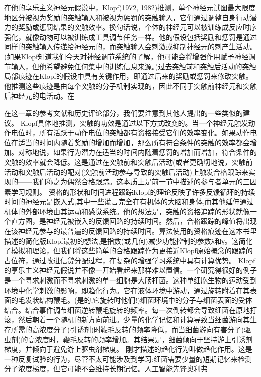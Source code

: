 在他的享乐主义神经元假说中，Klopf(1972, 1982)推测，单个神经元试图最大限度地区分被视为奖励的突触输入和被视为惩罚的突触输入，它们通过调整自身行动潜力的奖励或惩罚结果的突触效率。换句话说，个体的神经元可以被训练成反应时序强化，就像动物可以被训练成工具调节任务一样。他的假设包括奖励和惩罚是通过同样的突触输入传递给神经元的，而突触输入会刺激或抑制神经元的刺产生活动。(如果Klopf知道我们今天对神经调节系统的了解，他可能会将增强作用赋予神经调节输入，但他希望避免任何集中的训练信息来源。)过去突触前和突触后活动的突触局部痕迹在Klopf的假设中具有关键作用，即通过后来的奖励或惩罚来修改突触。他推测这些痕迹是由每个突触的分子机制实现的，因此不同于突触前神经元和突触后神经元的电活动。在

在这一章的参考文献和历史评论部分，我们要注意到其他人提出的一些类似的建议。
Klopf具体地推测，突触的功效是通过以下方式改变的。当一个神经元触发动作电位时，所有活跃于动作电位的突触都有资格接受它们的效率变化。如果动作电位在适当的时间内随着奖励的增加而增加，那么所有符合条件的突触的效率都会增加。对称地说，如果行为潜力在适当的时间内随着惩罚的增加而增加，符合条件的突触的效率就会降低。这是通过在突触前和突触后活动(或者更确切地说，突触前活动和突触后活动的配对(突触前活动参与导致的突触后活动)上触发合格跟踪来实现的——我们称之为偶然合格跟踪。这本质上是前一节中描述的参与者单元的三因素学习规则。
资格的形状和时间进程跟踪Klopf的理论反映了许多反馈循环的持续时间的神经元是嵌入式,其中一些谎言完全在有机体的大脑和身体,而其他延伸通过机体的外部环境由其运动和感觉系统。他的想法是，突触的资格追踪的形状就像一个直方图，是神经元被嵌入的反馈回路的持续时间。然后，合格跟踪的峰值将出现在该神经元参与的最普遍的反馈回路的持续时间。算法使用的资格痕迹在这本书里描述的简化版Klopf最初的想法,是指数(或几何)减少功能控制的参数λ和γ。这简化了模拟和理论，但我们将这些简单的合格跟踪作为更接近Klopf原始概念的跟踪的占位符，通过改进信贷分配过程，在复杂的增强学习系统中具有计算优势。
Klopf的享乐主义神经元假说并不像一开始看起来那样难以置信。一个研究得很好的例子是一个寻求刺激而不寻求刺激的单一细胞是大肠杆菌。这种单细胞生物的运动受到环境中化学刺激的影响，即趋化行为。它在液体环境中游动，通过旋转附着在其表面的毛发状结构鞭毛。(是的,它旋转时他们!)细菌环境中的分子与细菌表面的受体结合。结合事件调节细菌逆转鞭毛旋转的频率。每一次倒转都会导致细菌在原地打滚，然后朝着一个随机的新方向前进。少量的化学记忆和计算导致当细菌游向其生存所需的高浓度分子(引诱剂)时鞭毛反转的频率降低，而当细菌游向有害分子(驱虫剂)的高浓度时，鞭毛反转的频率增加。其结果是，细菌倾向于坚持游上引诱剂梯度，并倾向于避免游上驱虫剂梯度。
刚才描述的趋化行为叫做趋化作用。这是一种反复试验的行为，尽管不太可能涉及到学习:细菌需要少量的短期记忆来检测分子浓度梯度，但它可能不会维持长期记忆。人工智能先锋奥利弗


